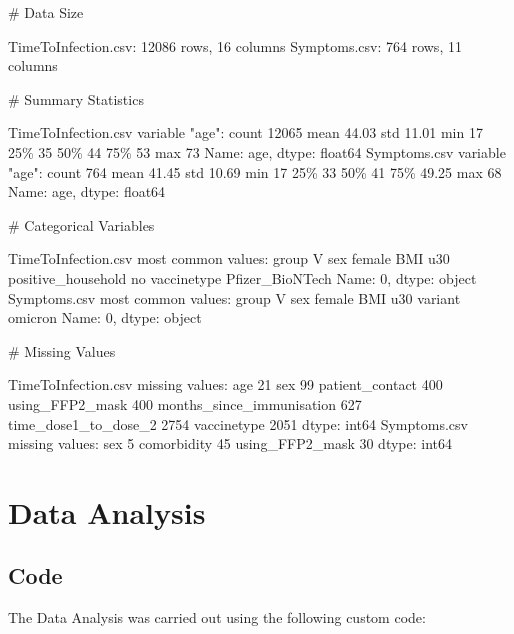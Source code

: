 \documentclass[11pt]{article}
\begin{document}
\begin{codeoutput}
\# Data Size

TimeToInfection.csv: 12086 rows, 16 columns
Symptoms.csv: 764 rows, 11 columns

\# Summary Statistics

TimeToInfection.csv variable "age":
count   12065
mean    44.03
std     11.01
min        17
25\%        35
50\%        44
75\%        53
max        73
Name: age, dtype: float64
Symptoms.csv variable "age":
count     764
mean    41.45
std     10.69
min        17
25\%        33
50\%        41
75\%     49.25
max        68
Name: age, dtype: float64

\# Categorical Variables

TimeToInfection.csv most common values:
group                               V
sex                            female
BMI                               u30
positive\_household                 no
vaccinetype           Pfizer\_BioNTech
Name: 0, dtype: object
Symptoms.csv most common values:
group            V
sex         female
BMI            u30
variant    omicron
Name: 0, dtype: object

\# Missing Values

TimeToInfection.csv missing values:
age                            21
sex                            99
patient\_contact               400
using\_FFP2\_mask               400
months\_since\_immunisation     627
time\_dose1\_to\_dose\_2         2754
vaccinetype                  2051
dtype: int64
Symptoms.csv missing values:
sex                 5
comorbidity        45
using\_FFP2\_mask    30
dtype: int64
\end{codeoutput}

\section{Data Analysis}
\subsection{{Code}}
The Data Analysis was carried out using the following custom code:
\end{document}
